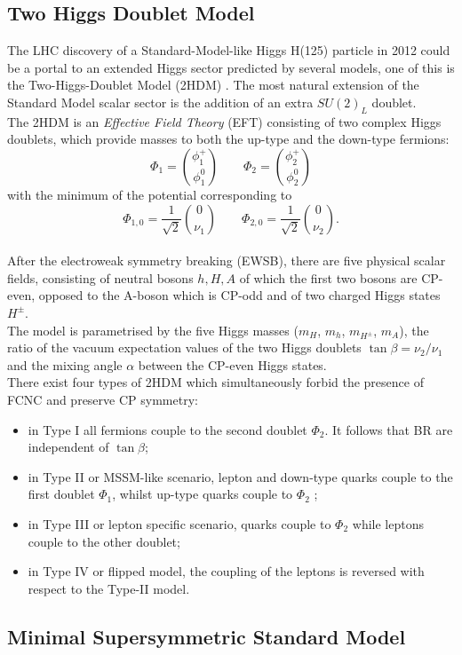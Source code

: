 \subsection{Two Higgs Doublet Model}
The LHC discovery of a Standard-Model-like Higgs H(125) particle in 2012\cite{higgsDiscovery} could be a portal to an extended Higgs sector predicted by several models, one of this is the Two-Higgs-Doublet Model (2HDM) \cite{h2dm}.
The most natural extension of the Standard Model scalar sector is the addition of an
extra $SU(2)_{L}$ doublet. 
\vspace{\baselineskip}
\\The 2HDM is an \textit{Effective Field Theory} (EFT\footnotemark) 
consisting of two complex Higgs doublets, which provide masses to both the up-type and the down-type fermions:
\begin{equation} 
	\Phi_{1}= \binom{\phi^{+}_{1}}{\phi^{0}_{1}}  \qquad \Phi_{2}= \binom{\phi^{+}_{2}}{\phi^{0}_{2}}
\end{equation}
with the minimum of the potential corresponding to
\begin{equation} 
	\Phi_{1,0}= \frac{1}{\sqrt{2}}\binom{0}{\nu_1}  \qquad \Phi_{2,0}= \frac{1}{\sqrt{2}}\binom{0}{\nu_2}.
\end{equation}
\\After the electroweak symmetry breaking (EWSB),
there are five physical scalar fields, consisting of neutral bosons $h,H,A$ of which the
first two bosons are CP-even, opposed to the A-boson which is CP-odd and of two charged Higgs states $H^{\pm}$.
\\The model is parametrised by the five Higgs masses ($m_H$, $m_h$, $m_{H^{\pm}}$, $m_A$), the ratio of the vacuum expectation 
values of the two Higgs doublets $\tan{\beta}= \nu_{2}/\nu_{1}$ and the mixing angle $\alpha$ between the CP-even Higgs states.
\\There exist four types of 2HDM which simultaneously forbid the presence of FCNC and preserve CP symmetry:
\begin{itemize}
	\item in Type I all fermions couple to the second doublet $\Phi_2$. It follows that BR are independent of $\tan{\beta}$;
	\item in Type II or MSSM-like scenario, lepton and down-type quarks couple to the first doublet $\Phi_1$, whilst up-type quarks couple to $\Phi_2$ ;
	\item in Type III or lepton specific scenario, quarks couple to  $\Phi_2$ while leptons couple to the other doublet;
	\item in Type IV or flipped model, the coupling of the leptons is reversed with respect to the Type-II model.
\end{itemize}	
	
\clearpage
\subsection{Minimal Supersymmetric Standard Model}

\clearpage

